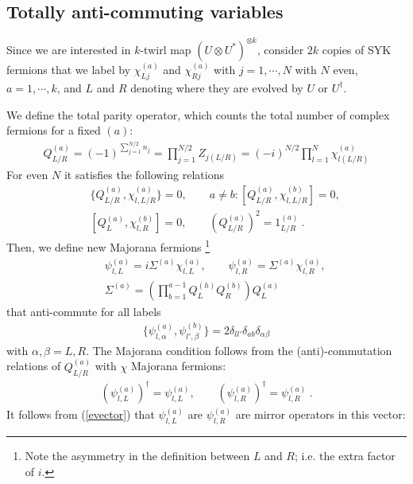 \documentclass{article}
\theoremstyle{definition}
\newcommand{\nn}{\nonumber}
\newcommand{\lb}{\left(}
\newcommand{\rb}{\right)}
\begin{document}
    \subsection{Totally anti-commuting variables}

    Since we are interested in $k$-twirl map $(U\otimes U^{*})^{\otimes k}$, consider
    $2k$ copies of SYK fermions that we label by $\chi^{(a)}_{L j}$ and $\chi^{(a)}
    _{R j}$ with $j=1,\cdots, N$ with $N$ even, $a=1,\cdots, k$, and $L$ and $R$
    denoting where they are evolved by $U$ or $U^{\dagger}$.

    We define the total parity operator, which counts the total number of
    complex fermions for a fixed $(a)$:
    \begin{eqnarray}
        Q^{(a)}_{L/R}=(-1)^{\sum_{j=1}^{N/2}n_j}=\prod_{j=1}^{N/2}Z_{j (L/R)}=(-i)^{N/2}\prod_{l=1}^{N}\chi_{l (L/R)}^{(a)}
    \end{eqnarray}
    For even $N$ it satisfies the following relations
    \begin{eqnarray}
        &&\{Q^{(a)}_{L/R},\chi^{(a)}_{l,L/R}\}=0,\qquad a\neq b: [Q^{(a)}_{L/R},\chi^{(b)}_{l,L/R}]=0,\nn\\
        &&[Q^{(a)}_L,\chi^{(b)}_{l,R}]=0,\qquad (Q^{(a)}_{L/R})^2=1^{(a)}_{L/R}\ .
    \end{eqnarray}
    Then, we define new Majorana fermions \footnote{Note the asymmetry in the
    definition between $L$ and $R$; i.e. the extra factor of $i$.}
    \begin{eqnarray}
        &&\psi_{l,L}^{(a)}=i \Sigma^{(a)}\chi_{l,L}^{(a)}, \qquad \psi_{l,R}^{(a)}=\Sigma^{(a)}\chi_{l,R}^{(a)},\nn\\
        &&\Sigma^{(a)}=\lb\prod_{b=1}^{a-1} Q_L^{(h)} Q_R^{(b)}\rb Q^{(a)}_L
    \end{eqnarray}
    that anti-commute for all labels
    \begin{eqnarray}
        \{\psi^{(a)}_{l, \alpha},\psi^{(b)}_{l',\beta}\}=2\delta_{ll'}\delta_{ab}\delta_{\alpha\beta}
    \end{eqnarray}
    with $\alpha,\beta=L,R$. The Majorana condition follows from the (anti)-commutation
    relations of $Q^{(a)}_{L/R}$ with $\chi$ Majorana fermions:
    \begin{eqnarray}
        (\psi^{(a)}_{l,L})^\dagger=\psi^{(a)}_{l,L},\qquad (\psi^{(a)}_{l,R})^\dagger=\psi^{(a)}_{l,R}\ .
    \end{eqnarray}
    It follows from (\ref{evector}) that $\psi_{l,L}^{(a)}$ are
    $\psi^{(a)}_{l,R}$ are mirror operators in this vector:
\end{document}
